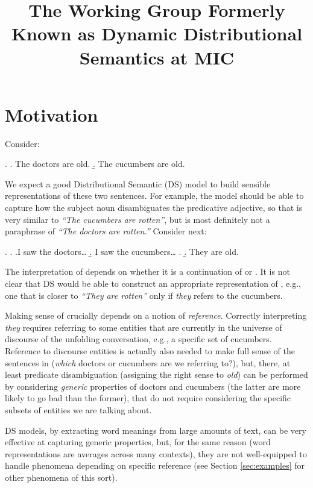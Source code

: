 \documentclass[a4paper,12pt]{article}
\title{The Working Group Formerly Known as Dynamic Distributional
  Semantics at MIC}
\begin{document}
\maketitle

\section{Motivation}
\label{sec:motivation}

Consider:

\ex.\label{ex1} \a. The doctors are old.
\b. The cucumbers are old.

We expect a good Distributional Semantic (DS) model to build sensible
representations of these two sentences. For example, the model should
be able to capture how the subject noun disambiguates the predicative
adjective, so that \Last[b] is very similar to \emph{``The cucumbers
  are rotten''}, but \Last[a] is most definitely not a paraphrase of
\emph{``The doctors are rotten.''} Consider next:

\ex. \label{ex:discourse-context}
\a. \a.I saw the doctors\ldots 
    \b. I saw the cucumbers\ldots
\z.
\b.\label{ex:they-are-old} They are old.

The interpretation of \Last[b] depends on whether it is a continuation
of \Last[a-i] or \Last[a-ii]. It is not clear that DS would be able to
construct an appropriate representation of \Last[b], e.g., one that is
closer to \emph{``They are rotten''} only if \emph{they} refers to the
cucumbers.

Making sense of \Last[b] crucially depends on a notion of
\emph{reference}.  Correctly interpreting \emph{they} requires
referring to some entities that are currently in the universe of
discourse of the unfolding conversation, e.g., a specific set of
cucumbers. Reference to discourse entities is actually also needed to
make full sense of the sentences in \LLast (\emph{which} doctors or
cucumbers are we referring to?), but, there, at least predicate
disambiguation (assigning the right sense to \emph{old}) can be
performed by considering \emph{generic} properties of doctors and
cucumbers (the latter are more likely to go bad than the former), that
do not require considering the specific subsets of entities we are
talking about.

DS models, by extracting word meanings from large amounts of text, can
be very effective at capturing generic properties, but, for the same
reason (word representations are averages across many contexts), they
are not well-equipped to handle phenomena depending on specific
reference (see Section \ref{sec:examples} for other phenomena of this
sort).
\end{document}
